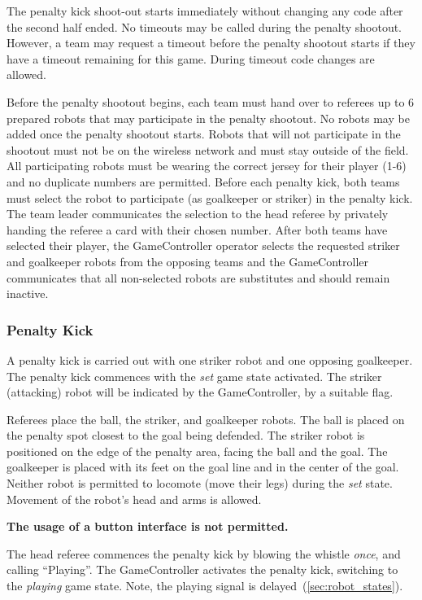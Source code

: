 The penalty kick shoot-out starts immediately without changing any code after the second half ended. No timeouts may be called during the penalty shootout. However, a team may request a timeout before the penalty shootout starts if they have a timeout remaining for this game. During timeout code changes are allowed.

Before the penalty shootout begins, each team must hand over to referees up to 6 prepared robots that may participate in the penalty shootout. No robots may be added once the penalty shootout starts. Robots that will not participate in the shootout must not be on the wireless network and must stay outside of the field. All participating robots must be wearing the correct jersey for their player (1-6) and no duplicate numbers are permitted. Before each penalty kick, both teams must select the robot to participate (as goalkeeper or striker) in the penalty kick. The team leader communicates the selection to the head referee by privately handing the referee a card with their chosen number. After both teams have selected their player, the GameController operator selects the requested striker and goalkeeper robots from the opposing teams and the GameController communicates that all non-selected robots are substitutes and should remain inactive.

\subsubsection{Penalty Kick}
\label{sec:penalty_kick}

A penalty kick is carried out with one striker robot and one opposing goalkeeper.
The penalty kick commences with the \textit{set} game state activated.
The striker (attacking) robot will be indicated by the GameController, by a suitable flag.

Referees place the ball, the striker, and goalkeeper robots. The ball is placed on the penalty spot closest to the goal being defended. The striker robot is positioned on the edge of the penalty area, facing the ball and the goal. The goalkeeper is placed with its feet on the goal line and in the center of the goal. Neither robot is permitted to locomote (move their legs) during the \textit{set} state. Movement of the robot's head and arms is allowed.

\textbf{The usage of a button interface is not permitted.}

The head referee commences the penalty kick by blowing the whistle \textit{once}, and calling ``Playing''.
The GameController activates the penalty kick, switching to the \emph{playing} game state.
Note, the playing signal is delayed~(\cf \cref{sec:robot_states}).

